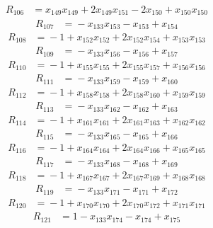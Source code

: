 \begin{align*}
R_{106}&={}x_{149}x_{149} +2x_{149}x_{151} -2x_{150} +x_{150}x_{150}
\end{align*}
\begin{align*}
R_{107}&={}-x_{133}x_{153} -x_{153} +x_{154}
\end{align*}
\begin{align*}
R_{108}&={}-1 +x_{152}x_{152} +2x_{152}x_{154} +x_{153}x_{153}
\end{align*}
\begin{align*}
R_{109}&={}-x_{133}x_{156} -x_{156} +x_{157}
\end{align*}
\begin{align*}
R_{110}&={}-1 +x_{155}x_{155} +2x_{155}x_{157} +x_{156}x_{156}
\end{align*}
\begin{align*}
R_{111}&={}-x_{133}x_{159} -x_{159} +x_{160}
\end{align*}
\begin{align*}
R_{112}&={}-1 +x_{158}x_{158} +2x_{158}x_{160} +x_{159}x_{159}
\end{align*}
\begin{align*}
R_{113}&={}-x_{133}x_{162} -x_{162} +x_{163}
\end{align*}
\begin{align*}
R_{114}&={}-1 +x_{161}x_{161} +2x_{161}x_{163} +x_{162}x_{162}
\end{align*}
\begin{align*}
R_{115}&={}-x_{133}x_{165} -x_{165} +x_{166}
\end{align*}
\begin{align*}
R_{116}&={}-1 +x_{164}x_{164} +2x_{164}x_{166} +x_{165}x_{165}
\end{align*}
\begin{align*}
R_{117}&={}-x_{133}x_{168} -x_{168} +x_{169}
\end{align*}
\begin{align*}
R_{118}&={}-1 +x_{167}x_{167} +2x_{167}x_{169} +x_{168}x_{168}
\end{align*}
\begin{align*}
R_{119}&={}-x_{133}x_{171} -x_{171} +x_{172}
\end{align*}
\begin{align*}
R_{120}&={}-1 +x_{170}x_{170} +2x_{170}x_{172} +x_{171}x_{171}
\end{align*}
\begin{align*}
R_{121}&={}1 -x_{133}x_{174} -x_{174} +x_{175}
\end{align*}
